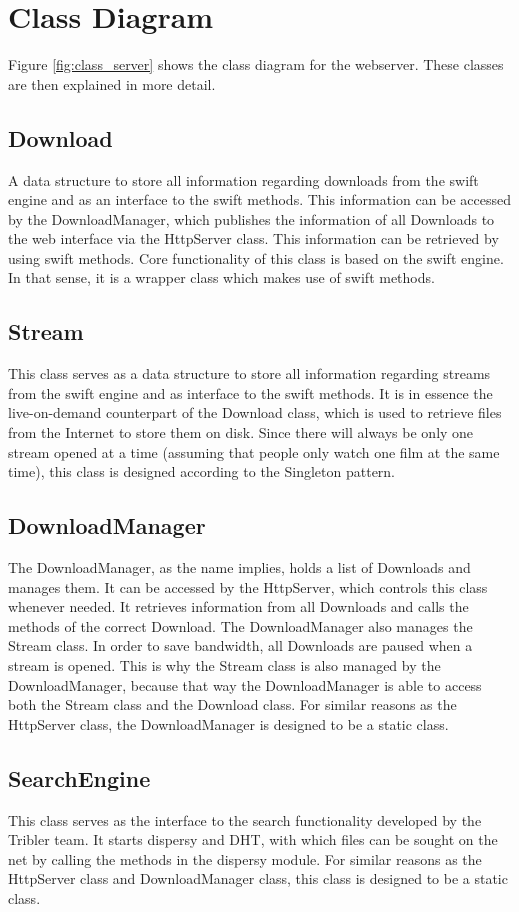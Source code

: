 \section{Class Diagram}
Figure \ref{fig:class_server} shows the class diagram for the webserver. These classes are then explained in more detail.

\subsection{Download}
A data structure to store all information regarding downloads from the swift engine and as an interface to the swift methods.
This information can be accessed by the DownloadManager, which publishes the information of all Downloads to the web interface via
the HttpServer class. This information can be retrieved by using swift methods. Core functionality of this class is based on the swift engine.
In that sense, it is a wrapper class which makes use of swift methods.

\subsection{Stream}
This class serves as a data structure to store all information regarding streams from the swift engine and as interface to the swift methods. It 
is in essence the live-on-demand counterpart of the Download class, which is used to retrieve files from the Internet to store them on disk.
Since there will always be only one stream opened at a time (assuming that people only watch one film at the same time),
this class is designed according to the Singleton pattern.

\subsection{DownloadManager}
The DownloadManager, as the name implies, holds a list of Downloads and manages them. It can be accessed by the HttpServer, which controls this
class whenever needed. It retrieves information from all Downloads and calls the methods of the correct Download. The DownloadManager also manages
 the Stream class. In order to save bandwidth, all Downloads are paused when a stream is opened. This is why the Stream class is also managed by
 the DownloadManager, because that way the DownloadManager is able to access both the Stream class and the Download class. For similar reasons as
 the HttpServer class, the DownloadManager is designed to be a static class.

\subsection{SearchEngine}
This class serves as the interface to the search functionality developed by the Tribler team. It starts dispersy and DHT,
with which files can be sought on the net by calling the methods in the dispersy module. For similar reasons as the HttpServer class and
DownloadManager class, this class is designed to be a static class.

